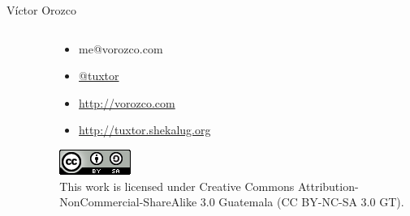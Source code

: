 \documentclass[aspectratio=169]{beamer}
\begin{document}
\begin{frame}{Víctor Orozco}
\begin{columns}[T]
\begin{column}[T]{4cm}
\begin{figure}
            \end{figure}
        \end{column}
        \begin{column}[T]{6cm} %
            \begin{itemize}
                \item me@vorozco.com
                \item \href{https://twitter.com/tuxtor}{@tuxtor}
                \item \href{https://vorozco.com}{http://vorozco.com}
                \item \href{https://tuxtor.shekalug.org}{http://tuxtor.shekalug.org}
            \end{itemize}
            \begin{center}
                \includegraphics[width=0.1\linewidth]{Images/cclogo}
                \\
                This work is licensed under Creative Commons Attribution-NonCommercial-ShareAlike 3.0 Guatemala (CC BY-NC-SA 3.0 GT).
            \end{center}
        \end{column}
    \end{columns}
\end{frame}
\end{document}
